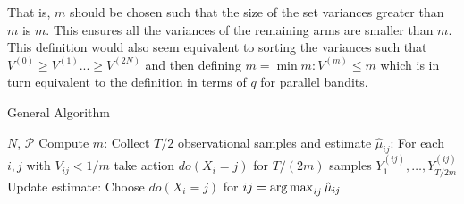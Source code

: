 

That is, $m$ should be chosen such that the size of the set variances greater than $m$ is $m$. This ensures all the variances of the remaining arms are smaller than $m$. This definition would also seem equivalent to sorting the variances such that $V^{(0)} \geq V^{(1)} ... \geq V^{(2N)}$ and then defining $m = \min m: V^{(m)} \leq m$ which is in turn equivalent to the definition in terms of $q$ for parallel bandits. 

\begin{algorithm}[H]
\caption{General Algorithm}
\begin{algorithmic}
 $N$, $\mathcal P$
\STATE Compute $m$:
\STATE Collect $T/2$ observational samples and estimate $\hat \mu_{ij}$:
\STATE For each $i,j $ with $V_{ij} < 1/m$ take action $do(X_i = j)$ for $T/(2m)$ samples $Y^{(ij)}_1,\ldots,Y^{(ij)}_{T/2m}$
\STATE Update estimate:
\ENDFOR
\STATE Choose $do(X_i = j)$ for $ij = \argmax_{ij} \hat \mu_{ij}$
\end{algorithmic}
\end{algorithm}





